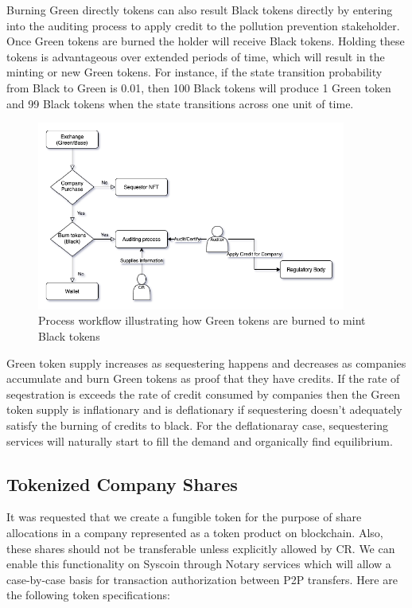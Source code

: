 \documentclass{article}
\begin{document}
Burning Green directly tokens can also result Black tokens directly by entering into the auditing process to apply credit to the pollution prevention stakeholder. Once Green tokens are burned the holder will receive Black tokens. Holding these tokens is advantageous over extended periods of time, which will result in the minting or new Green tokens. For instance, if the state transition probability from Black to Green is 0.01, then 100 Black tokens will produce 1 Green token and 99 Black tokens when the state transitions across one unit of time.

\begin{figure}[h]
\centering
\includegraphics[width=4in]{green_to_black.png}
\caption{ Process workflow illustrating how Green tokens are burned to mint Black tokens } 
\label{fig:green_to_black}
\end{figure} 

Green token supply increases as sequestering happens and decreases as companies accumulate and burn Green tokens as proof that they have credits. If the rate of seqestration is exceeds the rate of credit consumed by companies then the Green token supply is inflationary and is deflationary if sequestering doesn’t adequately satisfy the burning of credits to black. For the deflationaray case, sequestering services will naturally start to fill the demand and organically find equilibrium.





\subsection{Tokenized Company Shares}

It was requested that we create a fungible token for the purpose of share allocations in a company represented as a token product on blockchain. Also, these shares should not be transferable unless explicitly allowed by CR. We can enable this functionality on Syscoin through Notary services which will allow a case-by-case basis for transaction authorization between P2P transfers. Here are the following token specifications:
\end{document}
